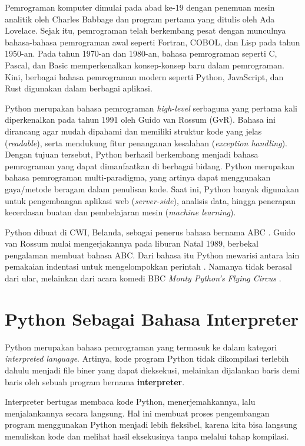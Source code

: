 Pemrograman komputer dimulai pada abad ke-19 dengan penemuan mesin analitik oleh Charles Babbage dan program pertama yang ditulis oleh Ada Lovelace. Sejak itu, pemrograman telah berkembang pesat dengan munculnya bahasa-bahasa pemrograman awal seperti Fortran, COBOL, dan Lisp pada tahun 1950-an. Pada tahun 1970-an dan 1980-an, bahasa pemrograman seperti C, Pascal, dan Basic memperkenalkan konsep-konsep baru dalam pemrograman. Kini, berbagai bahasa pemrograman modern seperti Python, JavaScript, dan Rust digunakan dalam berbagai aplikasi.

Python merupakan bahasa pemrograman \textit{high-level} serbaguna yang pertama kali diperkenalkan pada tahun 1991 oleh Guido van Rossum (GvR). Bahasa ini dirancang agar mudah dipahami dan memiliki struktur kode yang jelas (\textit{readable}), serta mendukung fitur penanganan kesalahan (\textit{exception handling}). Dengan tujuan tersebut, Python berhasil berkembang menjadi bahasa pemrograman yang dapat dimanfaatkan di berbagai bidang. Python merupakan bahasa pemrograman multi-paradigma, yang artinya dapat menggunakan gaya/metode beragam dalam penulisan kode. Saat ini, Python banyak digunakan untuk pengembangan aplikasi web (\textit{server-side}), analisis data, hingga penerapan kecerdasan buatan dan pembelajaran mesin (\textit{machine learning}).

Python dibuat di CWI, Belanda, sebagai penerus bahasa bernama ABC \cite{py-history}. Guido van Rossum mulai mengerjakannya pada liburan Natal 1989, berbekal pengalaman membuat bahasa ABC. Dari bahasa itu Python mewarisi antara lain pemakaian indentasi untuk mengelompokkan perintah \cite{py-faq-general}. Namanya tidak berasal dari ular, melainkan dari acara komedi BBC \textit{Monty Python's Flying Circus} \cite{py-faq-general}.

\section{Python Sebagai Bahasa Interpreter}
Python merupakan bahasa pemrograman yang termasuk ke dalam kategori
\textit{interpreted language}. Artinya, kode program Python tidak
dikompilasi terlebih dahulu menjadi file biner yang dapat dieksekusi,
melainkan dijalankan baris demi baris oleh sebuah program bernama
\textbf{interpreter}.

Interpreter bertugas membaca kode Python, menerjemahkannya, lalu
menjalankannya secara langsung. Hal ini membuat proses pengembangan
program menggunakan Python menjadi lebih fleksibel, karena kita bisa
langsung menuliskan kode dan melihat hasil eksekusinya tanpa melalui
tahap kompilasi.

